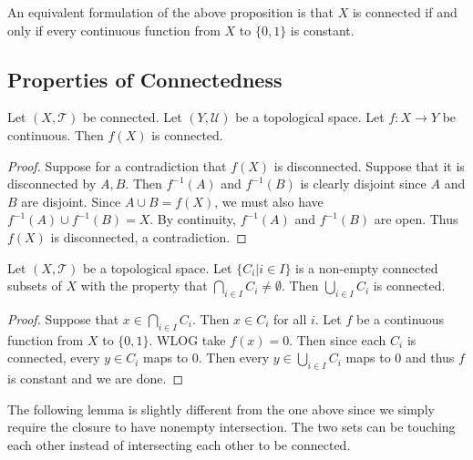 \documentclass[a4paper]{article}
\begin{document}
An equivalent formulation of the above proposition is that $X$ is connected if and only if every continuous function from $X$ to $\{0,1\}$ is constant. 

\subsection{Properties of Connectedness}
\begin{prp}{}{} Let $(X,\mathcal{T})$ be connected. Let $(Y,\mathcal{U})$ be a topological space. Let $f:X\to Y$ be continuous. Then $f(X)$ is connected. \tcbline
\begin{proof}
Suppose for a contradiction that $f(X)$ is disconnected. Suppose that it is disconnected by $A,B$. Then $f^{-1}(A)$ and $f^{-1}(B)$ is clearly disjoint since $A$ and $B$ are disjoint. Since $A\cup B=f(X)$, we must also have $f^{-1}(A)\cup f^{-1}(B)=X$. By continuity, $f^{-1}(A)$ and $f^{-1}(B)$ are open. Thus $f(X)$ is disconnected, a contradiction. 
\end{proof}
\end{prp}

\begin{prp}{}{} Let $(X,\mathcal{T})$ be a topological space. Let $\{C_i|i\in I\}$ is a non-empty connected subsets of $X$ with the property that $\bigcap_{i\in I}C_i\neq\emptyset$. Then $\bigcup_{i\in I}C_i$ is connected. \tcbline
\begin{proof}
Suppose that $x\in\bigcap_{i\in I}C_i$. Then $x\in C_i$ for all $i$. Let $f$ be a continuous function from $X$ to $\{0,1\}$. WLOG take $f(x)=0$. Then since each $C_i$ is connected, every $y\in C_i$ maps to $0$. Then every $y\in\bigcup_{i\in I}C_i$ maps to $0$ and thus $f$ is constant and we are done. 
\end{proof}
\end{prp}

The following lemma is slightly different from the one above since we simply require the closure to have nonempty intersection. The two sets can be touching each other instead of intersecting each other to be connected. 
\end{document}
